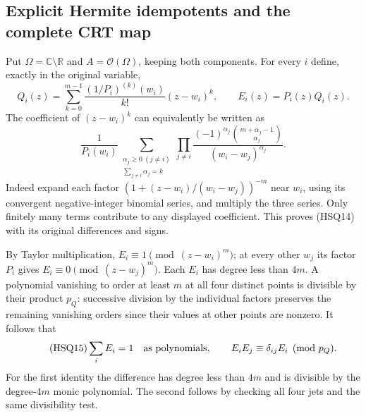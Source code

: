 \subsection{Explicit Hermite idempotents and the complete CRT map}

Put $\Omega=\mathbb C\setminus\mathbb R$ and
$A=\mathcal O(\Omega)$, keeping both components. For every $i$
define, exactly in the original variable,
\begin{equation}\tag{HSQ13}
 Q_i(z)=\sum_{k=0}^{m-1}
      \frac{(1/P_i)^{(k)}(w_i)}{k!}(z-w_i)^k,
 \qquad E_i(z)=P_i(z)Q_i(z).
\end{equation}
The coefficient of $(z-w_i)^k$ can equivalently be written as
\begin{equation}\tag{HSQ14}
 \frac1{P_i(w_i)}
 \sum_{\substack{\alpha_j\ge0\ (j\ne i)\\\sum_{j\ne i}\alpha_j=k}}
 \prod_{j\ne i}
   \frac{(-1)^{\alpha_j}\binom{m+\alpha_j-1}{\alpha_j}}
        {(w_i-w_j)^{\alpha_j}}.
\end{equation}
Indeed expand each factor
$(1+(z-w_i)/(w_i-w_j))^{-m}$ near $w_i$, using its convergent
negative-integer binomial series, and multiply the three series.
Only finitely many terms contribute to any displayed coefficient.
This proves (HSQ14) with its original differences and signs.

By Taylor multiplication, $E_i\equiv1\pmod{(z-w_i)^m}$;
at every other $w_j$ its factor $P_i$ gives
$E_i\equiv0\pmod{(z-w_j)^m}$. Each $E_i$ has degree less than
$4m$. A polynomial vanishing to order at least $m$ at all four
distinct points is divisible by their product $p_Q$: successive
division by the individual factors preserves the remaining
vanishing orders since their values at other points are nonzero.
It follows that
\begin{equation}\tag{HSQ15}
 \sum_iE_i=1\quad\hbox{as polynomials},\qquad
 E_iE_j\equiv\delta_{ij}E_i\pmod{p_Q}.
\end{equation}
For the first identity the difference has degree less than $4m$
and is divisible by the degree-$4m$ monic polynomial. The second
follows by checking all four jets and the same divisibility test.

